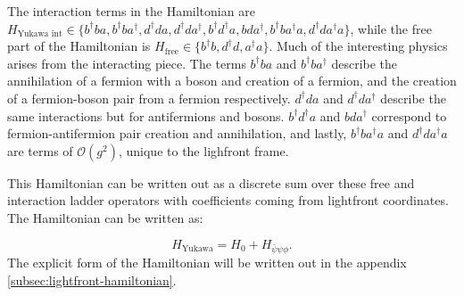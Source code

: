 The interaction terms in the Hamiltonian are $H_{\text{Yukawa int}} \in \{b^\dagger b a, b^\dagger b a^\dagger, d^\dagger d a, d^\dagger d a^\dagger, b^\dagger d^\dagger a, bda^\dagger, b^\dagger b a^\dagger a, d^\dagger d a^\dagger a \}$, while the free part of the Hamiltonian is $H_{\text{free}} \in \{b^\dagger b, d^\dagger d, a^\dagger a \}$. 
Much of the interesting physics arises from the interacting piece. The terms $b^\dagger b a$ and $b^\dagger b a^\dagger$ describe the annihilation of a fermion with a boson and creation of a fermion, and the creation of a fermion-boson pair from a fermion respectively. $d^\dagger d a$ and $d^\dagger d a^\dagger$ describe the same interactions but for antifermions and bosons. 
$b^\dagger d^\dagger a$ and $bda^\dagger$ correspond to fermion-antifermion pair creation and annihilation, and lastly, $b^\dagger b a^\dagger a$ and $d^\dagger d a^\dagger a$ are terms of $\mathcal{O}(g^2)$, unique to the lighfront frame.

This Hamiltonian can be written out as a discrete sum over these free and interaction ladder operators with coefficients coming from lightfront coordinates. The Hamiltonian can be written as:

\begin{equation}
    \label{eq:Yukawa-hamiltonian}
    H_{\text{Yukawa}} = H_0 + H_{\bar\psi \psi \phi}.
\end{equation}
The explicit form of the Hamiltonian will be written out in the appendix \ref{subsec:lightfront-hamiltonian}.

